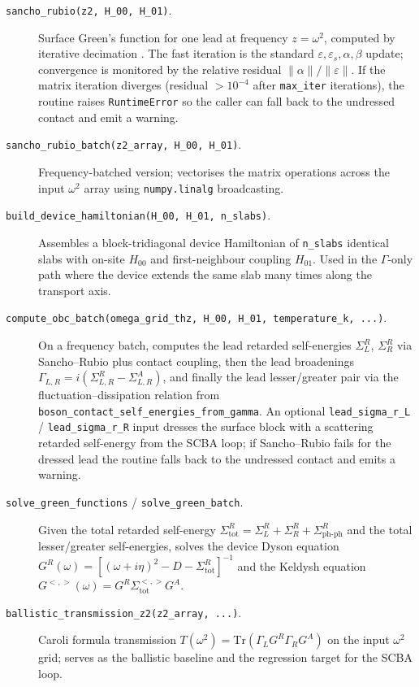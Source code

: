 \begin{description}
  \item[\texttt{sancho\_rubio(z2, H\_00, H\_01)}.]  Surface Green's
        function for one lead at frequency $z = \omega^2$, computed
        by iterative decimation \cite{sancho_highly_1985}.  The fast iteration
        is the standard $\varepsilon, \varepsilon_s, \alpha, \beta$
        update; convergence is monitored by the relative residual
        $\|\alpha\| / \|\varepsilon\|$.  If the matrix iteration
        diverges (residual $> 10^{-4}$ after \texttt{max\_iter}
        iterations), the routine raises \texttt{RuntimeError} so the
        caller can fall back to the undressed contact and emit a
        warning.

  \item[\texttt{sancho\_rubio\_batch(z2\_array, H\_00, H\_01)}.]
        Frequency-batched version; vectorises the matrix operations
        across the input $\omega^2$ array using \texttt{numpy.linalg}
        broadcasting.

  \item[\texttt{build\_device\_hamiltonian(H\_00, H\_01, n\_slabs)}.]
        Assembles a block-tridiagonal device Hamiltonian of
        \texttt{n\_slabs} identical slabs with on-site $H_{00}$ and
        first-neighbour coupling $H_{01}$.  Used in the
        $\Gamma$-only path where the device extends the same slab
        many times along the transport axis.

  \item[\texttt{compute\_obc\_batch(omega\_grid\_thz, H\_00, H\_01,
        temperature\_k, ...)}.]  On a frequency batch, computes the
        lead retarded self-energies $\Sigma^R_L$, $\Sigma^R_R$ via
        Sancho--Rubio plus contact coupling, then the lead
        broadenings $\Gamma_{L,R} = i(\Sigma^R_{L,R} - \Sigma^A_{L,R})$,
        and finally the lead lesser/greater pair via the
        fluctuation--dissipation relation from
        \texttt{boson\_contact\_self\_energies\_from\_gamma}.  An
        optional \texttt{lead\_sigma\_r\_L} /
        \texttt{lead\_sigma\_r\_R} input dresses the surface block
        with a scattering retarded self-energy from the SCBA loop; if
        Sancho--Rubio fails for the dressed lead the routine falls
        back to the undressed contact and emits a warning.

  \item[\texttt{solve\_green\_functions} /
        \texttt{solve\_green\_batch}.]  Given the total retarded
        self-energy
        $\Sigma^R_\mathrm{tot} = \Sigma^R_L + \Sigma^R_R + \Sigma^R_\mathrm{ph\text{-}ph}$
        and the total lesser/greater self-energies, solves the device
        Dyson equation
        $G^R(\omega) = [(\omega+i\eta)^2 - D - \Sigma^R_\mathrm{tot}]^{-1}$
        and the Keldysh equation
        $G^{<,>}(\omega) = G^R \Sigma^{<,>}_\mathrm{tot} G^A$.

  \item[\texttt{ballistic\_transmission\_z2(z2\_array, ...)}.]  Caroli
        formula transmission $T(\omega^2) = \mathrm{Tr}(\Gamma_L G^R \Gamma_R G^A)$
        on the input $\omega^2$ grid; serves as the ballistic
        baseline and the regression target for the SCBA loop.
\end{description}

